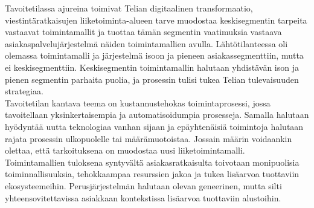 \documentclass[finnish,12pt,a4paper,pdftex]{article}
\begin{document}
Tavoitetilassa ajureina toimivat Telian digitaalinen transformaatio, viestintäratkaisujen liiketoiminta-alueen tarve muodostaa keskisegmentin tarpeita vastaavat toimintamallit ja tuottaa tämän segmentin vaatimuksia vastaava asiakaspalvelujärjestelmä näiden toimintamallien avulla. Lähtötilanteessa oli olemassa  toimintamalli ja järjestelmä isoon ja pieneen asiakassegmenttiin, mutta ei keskisegmenttiin. Keskisegmentin toimintamallin halutaan yhdistävän ison ja pienen segmentin parhaita puolia, ja prosessin tulisi tukea Telian tulevaisuuden strategiaa.\\


\noindent Tavoitetilan kantava teema on kustannustehokas toimintaprosessi, jossa tavoitellaan yksinkertaisempia ja automatisoidumpia prosesseja. Samalla halutaan hyödyntää uutta teknologiaa vanhan sijaan ja epäyhtenäisiä toimintoja halutaan rajata prosessin ulkopuolelle tai määrämuotoistaa. Jossain määrin voidaankin olettaa, että tarkoituksena on muodostaa uusi liiketoimintamalli.\\

\noindent Toimintamallien tuloksena syntyvältä asiakasratkaisulta toivotaan monipuolisia toiminnallisuuksia, tehokkaampaa resurssien jakoa ja tukea lisäarvoa tuottaviin ekosysteemeihin. Perusjärjestelmän halutaan olevan geneerinen, mutta silti yhteensovitettavissa asiakkaan kontekstissa lisäarvoa tuottaviin alustoihin. 


\end{document}
